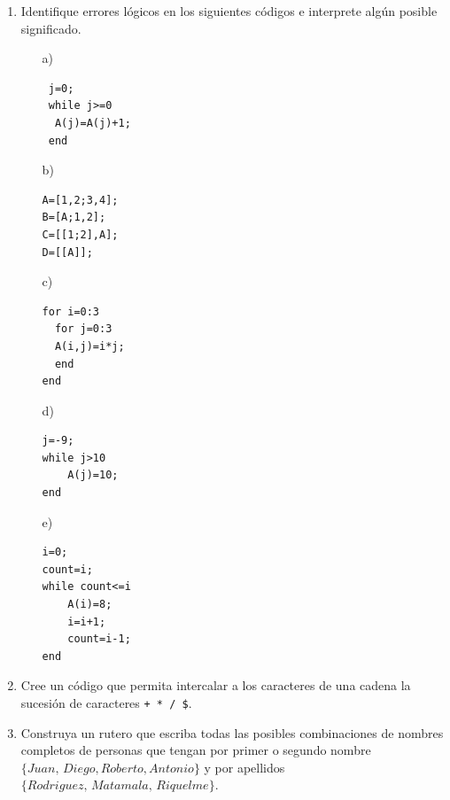 \documentclass[11pt,legalpaper]{article}
\begin{document}
\begin{enumerate}
\begin{multicols}{2}
\begin{itemize}
   \item[e)] 
\begin{verbatim}

A(1:10,1)=3;
for i=1:10
  j=1;
  while j<2
      if(i>1&&i<3)
      A(i,j)=A(i,j)+1;
      else
      A(i,j)=0;
      end
      j=j+1;
  end
end
\end{verbatim}

   \item[d)] 
\begin{verbatim}
A=1;
for i=1:10
  A(:,end+2)=1
  A(end+1,:)=0;
end
\end{verbatim}
    \end{itemize}
	\end{multicols}
    
    \item Identifique errores l\'ogicos en los siguientes c\'odigos e interprete alg\'un posible significado.
    
    \begin{multicols}{2} 
      \begin{itemize}
       \item[a)]
\begin{verbatim}
 j=0;
 while j>=0
  A(j)=A(j)+1;
 end
\end{verbatim}

       \item[b)]
\begin{verbatim}
A=[1,2;3,4];
B=[A;1,2];
C=[[1;2],A];
D=[[A]];
\end{verbatim}

       \item[c)]
\begin{verbatim}
for i=0:3
  for j=0:3
  A(i,j)=i*j;
  end
end
\end{verbatim}

       \item[d)]
\begin{verbatim}
j=-9;
while j>10
    A(j)=10;
end
\end{verbatim}

       \item[e)]
\begin{verbatim}
i=0;
count=i;
while count<=i
    A(i)=8;
    i=i+1;
    count=i-1;
end
\end{verbatim}
\end{itemize}
    \end{multicols}
\item Cree un c\'odigo que permita intercalar a los caracteres de una cadena la sucesi\'on de caracteres \texttt{+ * / \$}.
\item Construya un rutero que escriba todas las posibles combinaciones de nombres completos de personas que tengan por primer o segundo nombre $\{Juan,\, Diego, Roberto, Antonio\}$ y por apellidos $\{Rodriguez,\, Matamala,\, Riquelme\}$.
      
  \end{enumerate}
  
\end{document}
